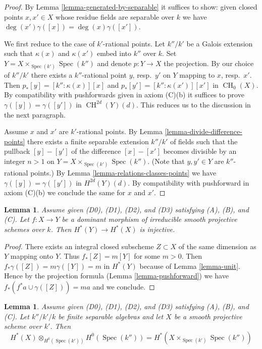 \documentclass{stacks-project}
\theoremstyle{plain}
\newtheorem{lemma}[subsection]{Lemma}
\theoremstyle{definition}
\theoremstyle{remark}
\numberwithin{equation}{subsection}
\def\Spec{\mathop{\mathrm{Spec}}}
\def\CH{\mathop{\mathrm{CH}}\nolimits}
\begin{document}
\begin{proof}
By Lemma \ref{lemma-generated-by-separable} it suffices to show: given
closed points $x, x' \in X$ whose residue fields are separable over $k$
we have $\deg(x') \gamma([x]) = \deg(x) \gamma([x'])$.

\medskip\noindent
We first reduce to the case of $k'$-rational points. Let $k''/k'$ be a
Galois extension such that $\kappa(x)$ and $\kappa(x')$ embed into $k''$
over $k$. Set $Y = X \times_{\Spec(k')} \Spec(k'')$ and denote $p : Y \to X$
the projection. By our choice of $k''/k'$ there exists a
$k''$-rational point $y$, resp.\ $y'$ on $Y$ mapping to $x$, resp.\ $x'$.
Then $p_*[y] = [k'' : \kappa(x)][x]$ and
$p_*[y'] = [k'' : \kappa(x')][x']$ in $\CH_0(X)$.
By compatibility with pushforwards given in axiom (C)(b)
it suffices to prove $\gamma([y]) = \gamma([y'])$ in $\CH^{2d}(Y)(d)$.
This reduces us to the discussion in the next paragraph.

\medskip\noindent
Assume $x$ and $x'$ are $k'$-rational points. By
Lemma \ref{lemma-divide-difference-points} there
exists a finite separable extension $k''/k'$ of fields
such that the pullback $[y] - [y']$
of the difference $[x] - [x']$ becomes divisible
by an integer $n > 1$ on $Y = X \times_{\Spec(k')} \Spec(k'')$.
(Note that $y, y' \in Y$ are $k''$-rational points.)
By Lemma \ref{lemma-relations-classes-points} we have
$\gamma([y]) = \gamma([y'])$ in $H^{2d}(Y)(d)$.
By compatibility with pushforward in axiom (C)(b)
we conclude the same for $x$ and $x'$.
\end{proof}

\begin{lemma}
\label{lemma-injective}
Assume given (D0), (D1), (D2), and (D3) satisfying (A), (B), and (C). Let
$f : X \to Y$ be a dominant morphism of irreducible smooth projective schemes
over $k$. Then $H^*(Y) \to H^*(X)$ is injective.
\end{lemma}

\begin{proof}
There exists an integral closed subscheme $Z \subset X$ of the same
dimension as $Y$ mapping onto $Y$. Thus $f_*[Z] = m[Y]$ for some $m > 0$.
Then $f_* \gamma([Z]) = m \gamma([Y]) = m$ in $H^*(Y)$ because of
Lemma \ref{lemma-unit}. Hence by the projection formula
(Lemma \ref{lemma-pushforward})
we have $f_*(f^*a \cup \gamma([Z])) = m a$ and we conclude.
\end{proof}

\begin{lemma}
\label{lemma-otimes}
Assume given (D0), (D1), (D2), and (D3) satisfying (A), (B), and (C). Let
$k''/k'/k$ be finite separable algebras and let $X$ be a
smooth projective scheme over $k'$. Then
$$
H^*(X) \otimes_{H^0(\Spec(k'))} H^0(\Spec(k'')) =
H^*(X \times_{\Spec(k')} \Spec(k''))
$$
\end{lemma}
\end{document}
